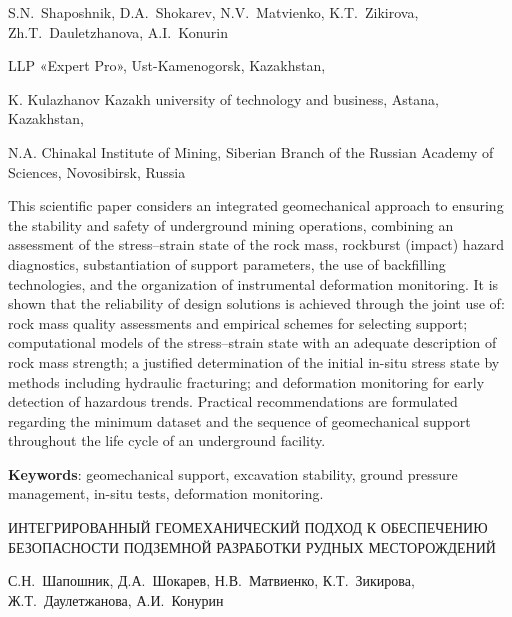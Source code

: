 
\begin{header}

S.N.~Shaposhnik,
D.A.~Shokarev,
N.V.~Matvienko,
K.T.~Zikirova,
Zh.T.~Dauletzhanova\envelope,
A.I.~Konurin
\end{header}

\begin{affil}
LLP «Expert Pro», Ust-Kamenogorsk, Kazakhstan,

K. Kulazhanov Kazakh university of technology and business, Astana, Kazakhstan,

N.A. Chinakal Institute of Mining, Siberian Branch of the Russian Academy of Sciences, Novosibirsk, Russia

\end{affil}

This scientific paper considers an integrated geomechanical approach to
ensuring the stability and safety of underground mining operations,
combining an assessment of the stress--strain state of the rock mass,
rockburst (impact) hazard diagnostics, substantiation of support
parameters, the use of backfilling technologies, and the organization of
instrumental deformation monitoring. It is shown that the reliability of
design solutions is achieved through the joint use of: rock mass quality
assessments and empirical schemes for selecting support; computational
models of the stress--strain state with an adequate description of rock
mass strength; a justified determination of the initial in-situ stress
state by methods including hydraulic fracturing; and deformation
monitoring for early detection of hazardous trends. Practical
reco\-mmendations are formulated regarding the minimum dataset and the
sequence of geomechanical support throughout the life cycle of an
underground facility.

{\bfseries Keywords}: geomechanical support, excavation stability, ground
pressure management, in-situ tests, deformation monitoring.

\begin{header}
ИНТЕГРИРОВАННЫЙ ГЕОМЕХАНИЧЕСКИЙ ПОДХОД К ОБЕСПЕЧЕНИЮ БЕЗОПАСНОСТИ ПОДЗЕМНОЙ РАЗРАБОТКИ РУДНЫХ МЕСТОРОЖДЕНИЙ

С.Н.~Шапошник,
Д.А.~Шокарев,
Н.В.~Матвиенко,
К.Т.~Зикирова,
Ж.Т.~Даулетжанова\envelope,
А.И.~Конурин
\end{header}

